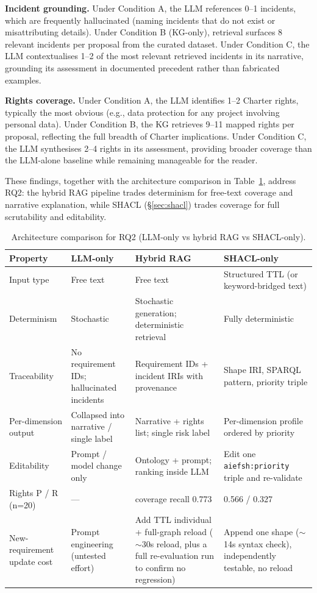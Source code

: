 \textbf{Incident grounding.} Under Condition A, the LLM references 0--1 incidents, which are frequently hallucinated (naming incidents that do not exist or misattributing details). Under Condition B (KG-only), retrieval surfaces 8 relevant incidents per proposal from the curated dataset. Under Condition C, the LLM contextualises 1--2 of the most relevant retrieved incidents in its narrative, grounding its assessment in documented precedent rather than fabricated examples.

\textbf{Rights coverage.} Under Condition A, the LLM identifies 1--2 Charter rights, typically the most obvious (e.g., data protection for any project involving personal data). Under Condition B, the KG retrieves 9--11 mapped rights per proposal, reflecting the full breadth of Charter implications. Under Condition C, the LLM synthesises 2--4 rights in its assessment, providing broader coverage than the LLM-alone baseline while remaining manageable for the reader.

These findings, together with the architecture comparison in Table~\ref{tab:arch_compare}, address RQ2: the hybrid RAG pipeline trades determinism for free-text coverage and narrative explanation, while SHACL (\S\ref{sec:shacl}) trades coverage for full scrutability and editability.

\begin{table}[htbp]
\centering
\caption{Architecture comparison for RQ2 (LLM-only vs hybrid RAG vs SHACL-only).}
\label{tab:arch_compare}
\begin{tabular}{p{2.2cm}p{3.0cm}p{3.0cm}p{3.2cm}}
\toprule
\textbf{Property} & \textbf{LLM-only} & \textbf{Hybrid RAG} & \textbf{SHACL-only} \\
\midrule
Input type & Free text & Free text & Structured TTL (or keyword-bridged text) \\
Determinism & Stochastic & Stochastic generation; deterministic retrieval & Fully deterministic \\
Traceability & No requirement IDs; hallucinated incidents & Requirement IDs + incident IRIs with provenance & Shape IRI, SPARQL pattern, priority triple \\
Per-dimension output & Collapsed into narrative / single label & Narrative + rights list; single risk label & Per-dimension profile ordered by priority \\
Editability & Prompt / model change only & Ontology + prompt; ranking inside LLM & Edit one \texttt{aiefsh:priority} triple and re-validate \\
Rights P / R (n=20) & --- & coverage recall 0.773 & 0.566 / 0.327 \\
New-requirement update cost & Prompt engineering (untested effort) & Add TTL individual + full-graph reload ($\sim$30s reload, plus a full re-evaluation run to confirm no regression) & Append one shape ($\sim$14s syntax check), independently testable, no reload \\
\bottomrule
\end{tabular}
\end{table}

